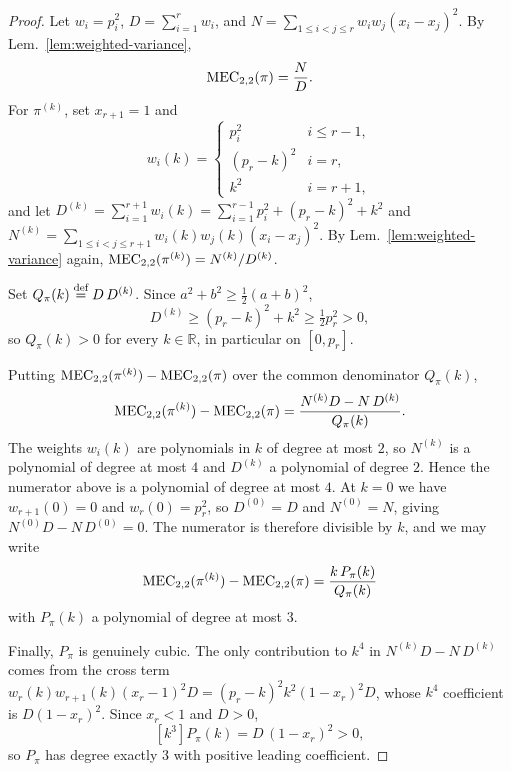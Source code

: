 \massTransfer*
\begin{proof}
Let \(w_i=p_i^2\), \(D=\sum_{i=1}^r w_i\), and \(N=\sum_{1\leq i<j\leq r}w_iw_j(x_i-x_j)^2\). By Lem.~\ref{lem:weighted-variance},
\[
\MEC[2,2](\pi)=\frac{N}{D}.
\]
For \(\pi^{(k)}\), set \(x_{r+1}=1\) and
\[
w_i(k)=
\begin{cases}
p_i^2 & i\le r-1,\\
(p_r-k)^2 & i=r,\\
k^2 & i=r+1,
\end{cases}
\]
and let \(D^{(k)}=\sum_{i=1}^{r+1}w_i(k)=\sum_{i=1}^{r-1}p_i^2+(p_r-k)^2+k^2\) and \(N^{(k)}=\sum_{1\leq i<j\leq r+1}w_i(k)w_j(k)(x_i-x_j)^2\). By Lem.~\ref{lem:weighted-variance} again, \(\MEC[2,2](\pi^{(k)})=N^{(k)}/D^{(k)}\).

Set \(Q_\pi(k)\stackrel{\text{def}}{=} D\,D^{(k)}\). Since \(a^2+b^2\geq\tfrac12(a+b)^2\),
\[
D^{(k)}\geq(p_r-k)^2+k^2\geq\tfrac12 p_r^2>0,
\]
so \(Q_\pi(k)>0\) for every \(k\in\mathbb{R}\), in particular on \([0,p_r]\).

Putting \(\MEC[2,2](\pi^{(k)})-\MEC[2,2](\pi)\) over the common denominator \(Q_\pi(k)\),
\[
\MEC[2,2](\pi^{(k)})-\MEC[2,2](\pi)=\frac{N^{(k)}D-N\,D^{(k)}}{Q_\pi(k)}.
\]
The weights \(w_i(k)\) are polynomials in \(k\) of degree at most \(2\), so \(N^{(k)}\) is a polynomial of degree at most \(4\) and \(D^{(k)}\) a polynomial of degree \(2\). Hence the numerator above is a polynomial of degree at most \(4\). At \(k=0\) we have \(w_{r+1}(0)=0\) and \(w_r(0)=p_r^2\), so \(D^{(0)}=D\) and \(N^{(0)}=N\), giving \(N^{(0)}D-N\,D^{(0)}=0\). The numerator is therefore divisible by \(k\), and we may write
\[
\MEC[2,2](\pi^{(k)})-\MEC[2,2](\pi)=\frac{k\,P_\pi(k)}{Q_\pi(k)}
\]
with \(P_\pi(k)\) a polynomial of degree at most \(3\).

Finally, \(P_\pi\) is genuinely cubic. The only contribution to \(k^4\) in \(N^{(k)}D-N\,D^{(k)}\) comes from the cross term \(w_r(k)w_{r+1}(k)(x_r-1)^2D=(p_r-k)^2k^2(1-x_r)^2D\), whose \(k^4\) coefficient is \(D(1-x_r)^2\). Since \(x_r<1\) and \(D>0\),
\[
[k^3]P_\pi(k)=D\,(1-x_r)^2>0,
\]
so \(P_\pi\) has degree exactly \(3\) with positive leading coefficient.
\end{proof}